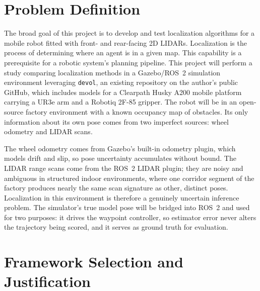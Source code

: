 \documentclass[11pt]{article}
\begin{document}
\jhutitlepage

\section{Problem Definition}
The broad goal of this project is to develop and test localization algorithms for a mobile robot fitted with front- and rear-facing 2D LIDARs.
Localization is the process of determining where an agent is in a given map.
This capability is a prerequisite for a robotic system's planning pipeline.
This project will perform a study comparing localization methods in a Gazebo/ROS~2 simulation environment leveraging \texttt{devol}, an existing repository on the author's public GitHub, which includes models for a Clearpath Husky A200 mobile platform carrying a UR3e arm and a Robotiq 2F-85 gripper.
The robot will be in an open-source factory environment with a known occupancy map of obstacles.
Its only information about its own pose comes from two imperfect sources: wheel odometry and LIDAR scans.

The wheel odometry comes from Gazebo's built-in odometry plugin, which models drift and slip, so pose uncertainty accumulates without bound.
The LIDAR range scans come from the ROS~2 LIDAR plugin; they are noisy and ambiguous in structured indoor environments, where one corridor segment of the factory produces nearly the same scan signature as other, distinct poses.
Localization in this environment is therefore a genuinely uncertain inference problem. 
The simulator's true model pose will be bridged into ROS~2 and used for two purposes: it drives the waypoint controller, so estimator error never alters the trajectory being scored, and it serves as ground truth for evaluation.

\section{Framework Selection and Justification}
\end{document}
